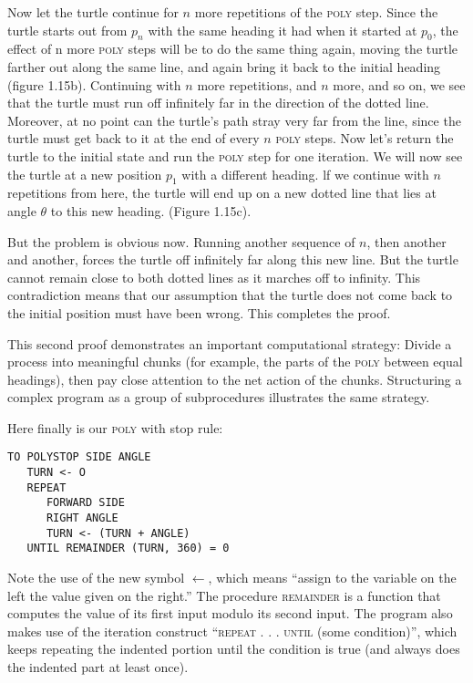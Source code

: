 \documentclass{book}
\begin{document}
Now let the turtle continue for $n$ more repetitions of the \textsc{poly} step.
Since the turtle starts out from $p_n$ with the same heading it had when
it started at $p_0$, the effect of n more \textsc{poly} steps will be to do the same
thing again, moving the turtle farther out along the same line, and again
bring it back to the initial heading (figure 1.15b). Continuing with $n$
more repetitions, and $n$ more, and so on, we see that the turtle must
run off infinitely far in the direction of the dotted line. Moreover, at no
point can the turtle's path stray very far from the line, since the turtle
must get back to it at the end of every $n$ \textsc{poly} steps.
Now let's return the turtle to the initial state and run the \textsc{poly} step
for one iteration. We will now see the turtle at a new position $p_1$ with a
different heading. lf we continue with $n$ repetitions from here, the turtle
will end up on a new dotted line that lies at angle $\theta$ to this new heading.
(Figure 1.15c).

But the problem is obvious now. Running another sequence of $n$,
then another and another, forces the turtle off infinitely far along this
new line. But the turtle cannot remain close to both dotted lines as it
marches off to infinity. This contradiction means that our assumption
that the turtle does not come back to the initial position must have been
wrong. This completes the proof.

This second proof demonstrates an important computational strategy:
Divide a process into meaningful chunks (for example, the parts of
the \textsc{poly} between equal headings), then pay close attention to the net
action of the chunks. Structuring a complex program as a group of
subprocedures illustrates the same strategy.

Here finally is our \textsc{poly} with stop rule:

\begin{verbatim}
TO POLYSTOP SIDE ANGLE
   TURN <- O
   REPEAT
      FORWARD SIDE
      RIGHT ANGLE
      TURN <- (TURN + ANGLE)
   UNTIL REMAINDER (TURN, 360) = 0
\end{verbatim}
Note the use of the new symbol $\leftarrow$, which means ``assign to the variable
on the left the value given on the right.'' The procedure \textsc{remainder} is
a function that computes the value of its first input modulo its second
input. The program also makes use of the iteration construct ``\textsc{repeat . . . until} (some condition)'', which keeps repeating the indented portion
until the condition is true (and always does the indented part at least
once).
\end{document}

